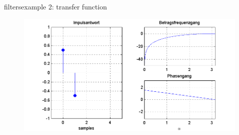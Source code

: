 	\begin{frame}{filters}{example 2: transfer function}
		\begin{figure}
			\centerline{\includegraphics[scale=.5]{graph/fx_02}}
		\end{figure}
	\end{frame}	
	
